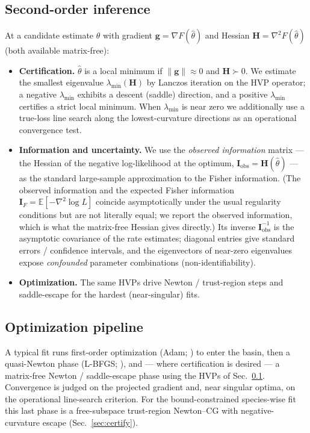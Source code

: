 \documentclass[11pt]{article}
\newcommand{\Hess}{\mathbf{H}}
\newcommand{\Fish}{\mathbf{I}}
\newcommand{\grad}{\mathbf{g}}
\begin{document}
\subsection{Second-order inference}
\label{sec:second}
At a candidate estimate $\hat\theta$ with gradient $\grad=\nabla F(\hat\theta)$
and Hessian $\Hess=\nabla^2 F(\hat\theta)$ (both available matrix-free):
\begin{itemize}[leftmargin=1.4em,itemsep=2pt]
\item \textbf{Certification.} $\hat\theta$ is a local minimum if
$\|\grad\|\approx 0$ and $\Hess\succ 0$. We estimate the smallest eigenvalue
$\lambda_{\min}(\Hess)$ by Lanczos iteration \citep{Lanczos1950} on the HVP operator; a negative
$\lambda_{\min}$ exhibits a descent (saddle) direction, and a positive
$\lambda_{\min}$ certifies a strict local minimum. When $\lambda_{\min}$ is
near zero we additionally use a true-loss line search along the lowest-curvature
directions as an operational convergence test.
\item \textbf{Information and uncertainty.} We use the \emph{observed
information} matrix --- the Hessian of the negative log-likelihood at the
optimum, $\Fish_{\mathrm{obs}} = \Hess(\hat\theta)$ --- as the standard
large-sample approximation to the Fisher information. (The observed information
and the expected Fisher information $\Fish_F = \mathbb{E}[-\nabla^2\log L]$
coincide asymptotically under the usual regularity conditions but are not
literally equal; we report the observed information, which is what the
matrix-free Hessian gives directly.) Its inverse $\Fish_{\mathrm{obs}}^{-1}$ is
the asymptotic covariance of the rate estimates; diagonal entries give standard
errors / confidence intervals, and the eigenvectors of near-zero eigenvalues
expose \emph{confounded} parameter combinations (non-identifiability).
\item \textbf{Optimization.} The same HVPs drive Newton / trust-region steps
and saddle-escape for the hardest (near-singular) fits.
\end{itemize}

\subsection{Optimization pipeline}
\label{sec:pipeline}
A typical fit runs first-order optimization (Adam; \citealp{Kingma2015}) to enter the basin, then a
quasi-Newton phase (L-BFGS; \citealp{LiuNocedal1989}), and --- where certification is desired --- a
matrix-free Newton / saddle-escape phase using the HVPs of
Sec.~\ref{sec:second}. Convergence is judged on the projected gradient and,
near singular optima, on the operational line-search criterion. For the
bound-constrained species-wise fit this last phase is a free-subspace
trust-region Newton--CG with negative-curvature escape (Sec.~\ref{sec:certify}).
\end{document}
